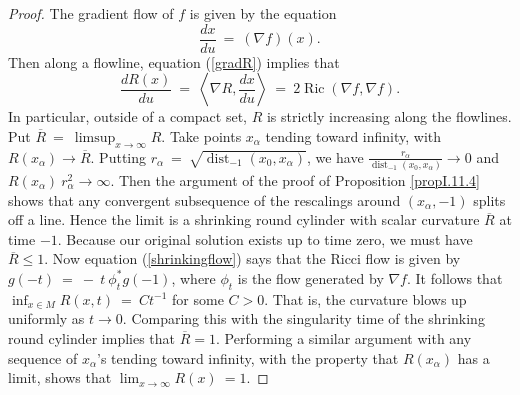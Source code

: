 \documentclass[12pt]{amsart}
\newcommand{\dist}{\operatorname{dist}}
\newcommand{\Ric}{\operatorname{Ric}}
\numberwithin{equation}{section}
\theoremstyle{plain}
\theoremstyle{definition}
\theoremstyle{remark}
\begin{document}
\begin{proof}
The gradient flow of $f$ is given by the equation
\begin{equation}
\frac{dx}{du} \: =\: (\nabla f)(x). 
\end{equation}
Then along a flowline, equation (\ref{gradR}) implies that
\begin{equation}
\frac{dR(x)}{du} \: = \: \left\langle \nabla R, \frac{dx}{du} \right\rangle
\: = \: 2 \Ric(\nabla f, \nabla f).
\end{equation}
In particular, outside of a compact set, $R$ is strictly increasing
along the flowlines. Put $\overline{R} \: = \: \limsup_{x \rightarrow \infty} 
R$.
Take points $x_\alpha$ tending toward infinity, with
$R(x_\alpha) \rightarrow \overline{R}$. Putting
${r}_\alpha \: = \: \sqrt{\dist_{-1}(x_0, x_\alpha)}$, we have
$\frac{{r}_\alpha}{\dist_{-1}(x_0, x_\alpha)} \rightarrow 0$ and
$R(x_\alpha) \: {r}_\alpha^2 \rightarrow \infty$.
Then the argument of the proof of Proposition \ref{propI.11.4}
shows that any convergent
subsequence of the rescalings around $(x_\alpha, -1)$ splits off
a line.  Hence the limit is a shrinking round cylinder with
scalar curvature $\overline{R}$ at time $-1$. Because our original
solution exists up to time zero, we must have 
$\overline{R} \le 1$.
Now equation
(\ref{shrinkingflow}) says that the Ricci flow
is given by $g(-t) \: = \: - \: t \: \phi_t^* g(-1)$, where
$\phi_t$ is the flow generated by $\nabla f$. 
It follows that $\inf_{x \in M} R(x,t) \: = \: Ct^{-1}$ for some $C > 0$.
That is, the curvature blows up uniformly as $t \rightarrow 0$.
Comparing this with the
singularity time of the shrinking round cylinder implies that
$\overline{R} = 1$. Performing a similar argument with any
sequence of $x_\alpha$'s tending toward infinity, with the property
that $R(x_\alpha)$ has a limit, shows that 
$\lim_{x \rightarrow \infty} R(x) \: = 1$.


\end{proof}
\end{document}
